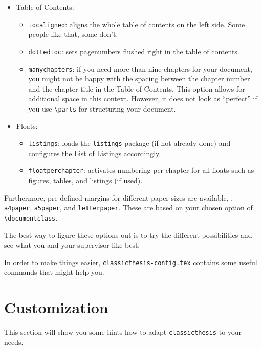 \begin{itemize}

    \item Table of Contents:
        \begin{itemize}
            \item\texttt{tocaligned}: aligns the whole table of contents on
            the left side. Some people like that, some don't.

            \item\texttt{dottedtoc}: sets pagenumbers flushed right in the
            table of contents.

            \item\texttt{manychapters}: if you need more than nine chapters for
            your document, you might not be happy with the spacing between the
            chapter number and the chapter title in the Table of Contents.
            This option allows for additional space in this context.
            However, it does not look as ``perfect'' if you use
            \verb|\parts| for structuring your document.
        \end{itemize}

    \item Floats:
        \begin{itemize}
            \item\texttt{listings}: loads the \texttt{listings} package (if not
            already done) and configures the List of Listings accordingly.

            \item\texttt{floatperchapter}: activates numbering per chapter for
            all floats such as figures, tables, and listings (if used).
        \end{itemize}

\end{itemize}

Furthermore, pre-defined margins for different paper sizes are available, \eg, \texttt{a4paper}, \texttt{a5paper}, and \texttt{letterpaper}. These are based on your chosen option of \verb|\documentclass|.

The best way to figure these options out is to try the different
possibilities and see what you and your supervisor like best.

In order to make things easier, \texttt{classicthesis-config.tex}
contains some useful commands that might help you.


\section{Customization}\label{sec:custom}
This section will show you some hints how to adapt
\texttt{classicthesis} to your needs.

